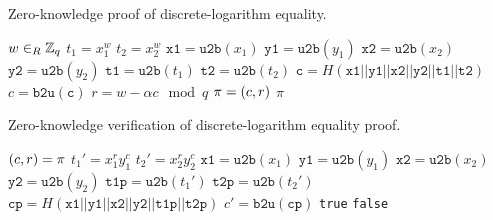 \begin{algorithm}[p]
    \caption{Zero-knowledge proof of discrete-logarithm equality.}
\label{alg:zk_dleq_proof}
\begin{algorithmic}[1]
    \State $w\in_{R}\mathbb{Z}_{q}$
    \State $t_{1} = x_{1}^{w}$
    \State $t_{2} = x_{2}^{w}$
    \State $\texttt{x1} = \texttt{u2b}(x_{1})$
    \State $\texttt{y1} = \texttt{u2b}(y_{1})$
    \State $\texttt{x2} = \texttt{u2b}(x_{2})$
    \State $\texttt{y2} = \texttt{u2b}(y_{2})$
    \State $\texttt{t1} = \texttt{u2b}(t_{1})$
    \State $\texttt{t2} = \texttt{u2b}(t_{2})$
    \State $\texttt{c}  = H(\texttt{x1}||\texttt{y1}||\texttt{x2}||\texttt{y2}||\texttt{t1}||\texttt{t2})$
    \State $c = \texttt{b2u}(\texttt{c})$
    \State $r = w - \alpha c \mod q$
    \State $\pi = \left( c,r \right)$
    \State \Return $\pi$
\EndFunction
\end{algorithmic}
\end{algorithm}

\begin{algorithm}[p]
    \caption{Zero-knowledge verification of discrete-logarithm equality proof.}
\label{alg:zk_dleq_verify}
\begin{algorithmic}[1]
    \State $\left( c,r \right) = \pi$
    \State $t_{1}' = x_{1}^{r}y_{1}^{c}$
    \State $t_{2}' = x_{2}^{r}y_{2}^{c}$
    \State $\texttt{x1}  = \texttt{u2b}(x_{1})$
    \State $\texttt{y1}  = \texttt{u2b}(y_{1})$
    \State $\texttt{x2}  = \texttt{u2b}(x_{2})$
    \State $\texttt{y2}  = \texttt{u2b}(y_{2})$
    \State $\texttt{t1p} = \texttt{u2b}(t_{1}')$
    \State $\texttt{t2p} = \texttt{u2b}(t_{2}')$
    \State $\texttt{cp}  = H(\texttt{x1}||\texttt{y1}||\texttt{x2}||\texttt{y2}||\texttt{t1p}||\texttt{t2p})$
    \State $c' = \texttt{b2u}(\texttt{cp})$
        \State \Return \texttt{true}
    \Else
        \State \Return \texttt{false}
    \EndIf
\EndFunction

\end{algorithmic}
\end{algorithm}
